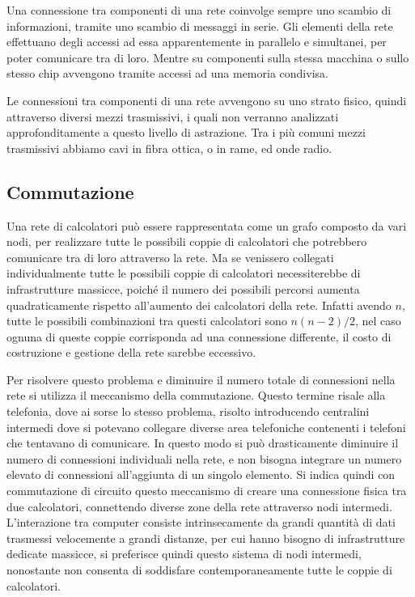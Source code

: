 \documentclass{article}
\numberwithin{equation}{subsection}
\begin{document}
Una connessione tra componenti di una rete coinvolge sempre uno scambio di informazioni, tramite uno scambio di messaggi in serie. Gli elementi della 
rete effettuano degli accessi ad essa apparentemente in parallelo e simultanei, per poter comunicare tra di loro. Mentre su componenti sulla stessa macchina o sullo 
stesso chip avvengono tramite accessi ad una memoria condivisa. 

Le connessioni tra componenti di una rete avvengono su uno strato fisico, quindi attraverso diversi mezzi trasmissivi, i quali non verranno analizzati approfonditamente a 
questo livello di astrazione. Tra i più comuni mezzi trasmissivi abbiamo cavi in fibra ottica, o in rame, ed onde radio. 

\subsection{Commutazione}

Una rete di calcolatori può essere rappresentata come un grafo composto da vari nodi, per realizzare tutte le possibili coppie di calcolatori che potrebbero comunicare 
tra di loro attraverso la rete. Ma se venissero collegati individualmente tutte le possibili coppie di calcolatori necessiterebbe di infrastrutture massicce, poiché 
il numero dei possibili percorsi aumenta quadraticamente rispetto all'aumento dei calcolatori della rete. Infatti avendo $n$, tutte le possibili combinazioni tra 
questi calcolatori sono $n(n-2)/2$, nel caso ognuna di queste coppie corrisponda ad una connessione differente, il costo di costruzione e gestione della rete 
sarebbe eccessivo. 

Per risolvere questo problema e diminuire il numero totale di connessioni nella rete si utilizza il meccanismo della commutazione. Questo termine risale alla telefonia, 
dove ai sorse lo stesso problema, risolto introducendo centralini intermedi dove si potevano collegare diverse area telefoniche contenenti i telefoni che tentavano 
di comunicare. In questo modo si può drasticamente diminuire il numero di connessioni individuali nella rete, e non bisogna integrare un numero elevato di connessioni 
all'aggiunta di un singolo elemento. 
Si indica quindi con commutazione di circuito questo meccanismo di creare una connessione fisica tra due calcolatori, connettendo diverse zone 
della rete attraverso nodi intermedi. L'interazione tra computer consiste intrinsecamente da grandi quantità di dati trasmessi velocemente a grandi distanze, per cui 
hanno bisogno di infrastrutture dedicate massicce, si preferisce quindi questo sistema di nodi intermedi, nonostante non consenta di soddisfare contemporaneamente 
tutte le coppie di calcolatori. 
\end{document}
